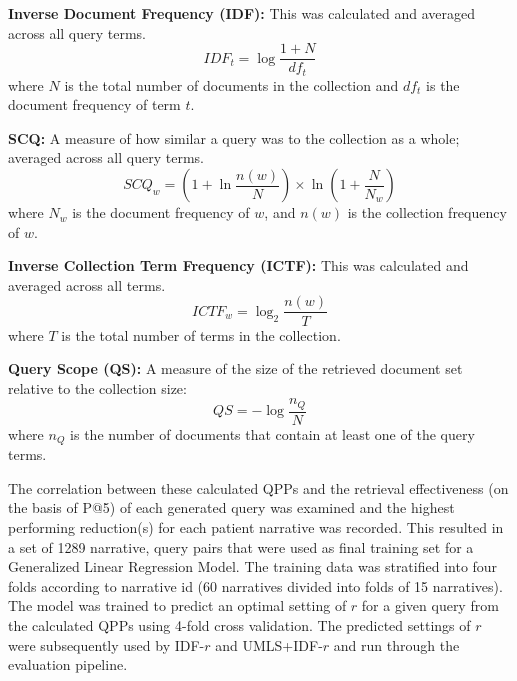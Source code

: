 \documentclass[a4paper]{report}
\begin{document}
\textbf{Inverse Document Frequency (IDF):} This was calculated and
averaged across all query terms.
$$IDF_t = \log \frac{1+N}{df_t}$$  
where $N$ is the total number of documents in the collection and $df_t$ is the
document frequency of term $t$.

\textbf{SCQ:} A measure of how similar a query was to the collection as a
whole; averaged across all query terms. 
$$SCQ_w = (1+ \ln{\frac{n(w)}{N}}) \times \ln{(1 + \frac{N}{N_w})}$$
where $N_w$ is the document frequency of $w$, and $n(w)$ is the collection frequency of $w$. 

\textbf{Inverse Collection Term Frequency (ICTF):} This was calculated
and averaged across all terms. 
$$ICTF_w = \log_2{\frac{n(w)}{T}}$$
where $T$ is the total number of terms in the collection.

\textbf{Query Scope (QS):} A measure of the size of the retrieved document
set relative to the collection size: 
$$QS = -\log{\frac{n_Q}{N}}$$ 
where $n_Q$ is the number of documents that contain at least one of the query terms.

The correlation between these calculated QPPs and the retrieval effectiveness (on the basis of P@5) of each generated query was examined and the highest performing reduction(s) for each patient narrative was recorded. This resulted in a set of 1289 narrative, query pairs that were used as final training set for a Generalized Linear Regression Model. The training
data was stratified into four folds according to narrative id (60 narratives
divided into folds of 15 narratives). The model was trained to predict an optimal setting of $r$ for a given query from the calculated QPPs using 4-fold cross validation. The predicted settings of $r$ were subsequently used by IDF-$r$ and UMLS+IDF-$r$ and run through the evaluation pipeline. 
\end{document}
